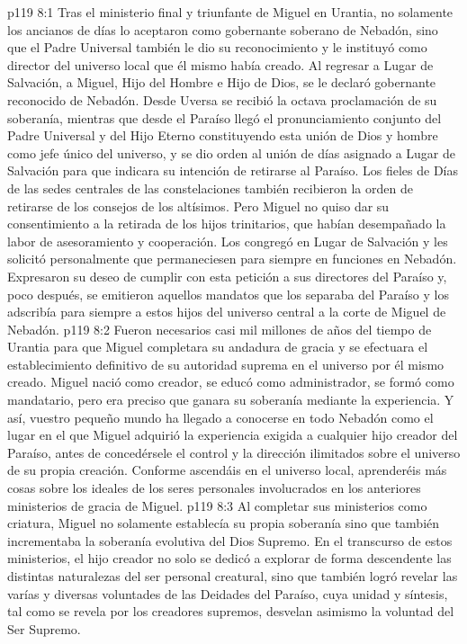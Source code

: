 \vs p119 8:1 Tras el ministerio final y triunfante de Miguel en Urantia, no solamente los ancianos de días lo aceptaron como gobernante soberano de Nebadón, sino que el Padre Universal también le dio su reconocimiento y le instituyó como director del universo local que él mismo había creado. Al regresar a Lugar de Salvación, a Miguel, Hijo del Hombre e Hijo de Dios, se le declaró gobernante reconocido de Nebadón. Desde Uversa se recibió la octava proclamación de su soberanía, mientras que desde el Paraíso llegó el pronunciamiento conjunto del Padre Universal y del Hijo Eterno constituyendo esta unión de Dios y hombre como jefe único del universo, y se dio orden al unión de días asignado a Lugar de Salvación para que indicara su intención de retirarse al Paraíso. Los fieles de Días de las sedes centrales de las constelaciones también recibieron la orden de retirarse de los consejos de los altísimos. Pero Miguel no quiso dar su consentimiento a la retirada de los hijos trinitarios, que habían desempañado la labor de asesoramiento y cooperación. Los congregó en Lugar de Salvación y les solicitó personalmente que permaneciesen para siempre en funciones en Nebadón. Expresaron su deseo de cumplir con esta petición a sus directores del Paraíso y, poco después, se emitieron aquellos mandatos que los separaba del Paraíso y los adscribía para siempre a estos hijos del universo central a la corte de Miguel de Nebadón.
\vs p119 8:2 \pc Fueron necesarios casi mil millones de años del tiempo de Urantia para que Miguel completara su andadura de gracia y se efectuara el establecimiento definitivo de su autoridad suprema en el universo por él mismo creado. Miguel nació como creador, se educó como administrador, se formó como mandatario, pero era preciso que ganara su soberanía mediante la experiencia. Y así, vuestro pequeño mundo ha llegado a conocerse en todo Nebadón como el lugar en el que Miguel adquirió la experiencia exigida a cualquier hijo creador del Paraíso, antes de concedérsele el control y la dirección ilimitados sobre el universo de su propia creación. Conforme ascendáis en el universo local, aprenderéis más cosas sobre los ideales de los seres personales involucrados en los anteriores ministerios de gracia de Miguel.
\vs p119 8:3 \pc Al completar sus ministerios como criatura, Miguel no solamente establecía su propia soberanía sino que también incrementaba la soberanía evolutiva del Dios Supremo. En el transcurso de estos ministerios, el hijo creador no solo se dedicó a explorar de forma descendente las distintas naturalezas del ser personal creatural, sino que también logró revelar las varías y diversas voluntades de las Deidades del Paraíso, cuya unidad y síntesis, tal como se revela por los creadores supremos, desvelan asimismo la voluntad del Ser Supremo.
